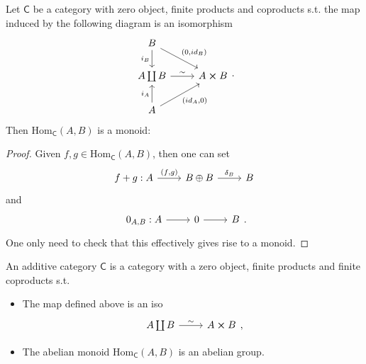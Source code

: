 \documentclass[../Main]{subfiles}
\begin{document}
\begin{lem}
	Let $\mathsf{C}$ be a category with zero object,
	finite products and coproducts
	s.t. the map induced by the following diagram is an isomorphism
	\begin{equation}
	\begin{tikzcd}
		B \arrow[rd, "(0\text{,} id_B)", rightarrow] \arrow[d, "i_B"', rightarrow] & \\
		A \coprod B \arrow[r, "\sim", rightarrow] &
		A \cross B \\
		A \arrow[u, "i_A", rightarrow] \arrow[ru, "(id_A\text{,} 0)"', rightarrow] &
	\end{tikzcd}
	.\end{equation} 
	Then $\mathrm{Hom}_{\mathsf{C}} \left( A, B \right)$ is a monoid:
\end{lem} 
\begin{proof}
	Given $f,g \in \mathrm{Hom}_{\mathsf{C}} \left( A, B \right)$, then
	one can set
	\begin{equation}
	\begin{tikzcd}
		f+g : 
		A \arrow[r, "(f\text{,} g)", rightarrow] &
		B \oplus B \arrow[r, "\delta_B", rightarrow] &
		B
	\end{tikzcd}
	\end{equation} 
	and
	\begin{equation}
	\begin{tikzcd}
		0_{A,B} :
		A \arrow[r, "", rightarrow] &
		0 \arrow[r, "", rightarrow] &
		B
	\end{tikzcd}
	.\end{equation} 
	One only need to check that this effectively gives rise to a monoid.
\end{proof}

\begin{defn}
	An additive category $\mathsf{C}$ is a category with a zero object,
	finite products and finite coproducts s.t.
	\begin{itemize}
		\item The map defined above is an iso
			\begin{equation}
			\begin{tikzcd}
				A \coprod B \arrow[r, "\sim", rightarrow] &
				A \cross B
			\end{tikzcd}
			,\end{equation} 
		\item The abelian monoid $\mathrm{Hom}_{\mathsf{C}} \left( A, B \right)$
			is an abelian group.
	\end{itemize}
\end{defn}
\end{document}
